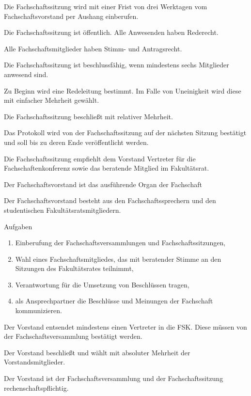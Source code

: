 \documentclass[a4paper,parskip=half,numbers=noenddot]{scrartcl}
\begin{document}
\begin{contract}
Die Fachschaftssitzung wird mit einer Frist von drei Werktagen vom Fachschaftsvorstand per Aushang einberufen.

Die Fachschaftssitzung ist öffentlich. Alle Anwesenden haben Rederecht.

Alle Fachschaftsmitglieder haben Stimm- und Antragsrecht.

Die Fachschaftssitzung ist beschlussfähig, wenn mindestens sechs Mitglieder anwesend sind.

Zu Beginn wird eine Redeleitung bestimmt. Im Falle von Uneinigkeit wird diese mit einfacher Mehrheit gewählt.

Die Fachschaftssitzung beschließt mit relativer Mehrheit. 

Das Protokoll wird von der Fachschaftssitzung auf der nächsten Sitzung bestätigt und soll bis zu deren Ende veröffentlicht werden.

Die Fachschaftssitzung empfiehlt dem Vorstand Vertreter für die Fachschaftenkonferenz sowie das beratende Mitglied im Fakultätsrat.


\label{fs:vorstand}

Der Fachschaftsvorstand ist das ausführende Organ der Fachschaft

Der Fachschaftsvorstand besteht aus den Fachschaftssprechern und den studentischen Fakultätsratsmitgliedern.

Aufgaben
\begin{enumerate}
\item Einberufung der Fachschaftsversammlungen und Fachschaftssitzungen,
\item Wahl eines Fachschaftsmitgliedes, das mit beratender Stimme an den Sitzungen des Fakultätsrates teilnimmt,
\item Verantwortung für die Umsetzung von Beschlüssen tragen,
\item als Ansprechpartner die Beschlüsse und Meinungen der Fachschaft kommunizieren.
\end{enumerate}
 
Der Vorstand entsendet mindestens einen Vertreter in die FSK. Diese müssen von der Fachschaftsversammlung bestätigt werden.

Der Vorstand beschließt und wählt mit absoluter Mehrheit der Vorstandsmitglieder.

Der Vorstand ist der Fachschaftsversammlung und der Fachschaftssitzung rechenschaftspflichtig.


%
%


\end{contract}
\end{document}
